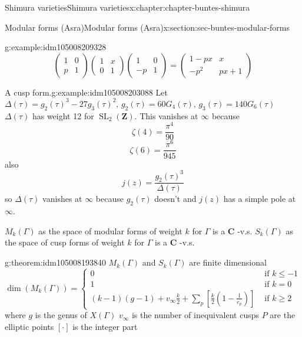 \documentclass[oneside,10pt,]{book}
\numberwithin{equation}{section}
\newcommand{\lb}{[}
\newcommand{\rb}{]}
\newcommand{\ZZ}{\mathbf{Z}}
\newcommand{\CC}{\mathbf{C}}
\DeclareMathOperator{\SL}{SL}
\newcommand{\amp}{&}
\begin{document}
\begin{chapterptx}{Shimura varieties}{}{Shimura varieties}{}{}{x:chapter:chapter-buntes-shimura}
\begin{sectionptx}{Modular forms (Asra)}{}{Modular forms (Asra)}{}{}{x:section:sec-buntes-modular-forms}
\begin{example}{}{g:example:idm105008209328}
\begin{equation*}
\begin{pmatrix} 1\amp 0 \\ p \amp 1 \end{pmatrix} \begin{pmatrix} 1\amp x \\ 0 \amp 1 \end{pmatrix} \begin{pmatrix} 1\amp 0 \\ -p \amp 1 \end{pmatrix}  = \begin{pmatrix} 1 - px \amp x  \\ -p^2 \amp px+ 1 \end{pmatrix}
\end{equation*}
%
\end{example}
\begin{example}{A cusp form.}{g:example:idm105008203088}%
Let \(\Delta(\tau) = g_2(\tau)^3 - 27g_3(\tau)^2,\,g_2(\tau) = 60G_4(\tau),\,g_3(\tau) =140G_6(\tau)\) \(\Delta(\tau)\) has weight 12 for \(\SL_2(\ZZ)\). This vanishes at \(\infty\) because%
\begin{equation*}
\zeta(4) = \frac{\pi^4}{90}
\end{equation*}
%
\begin{equation*}
\zeta(6) = \frac{\pi^6}{945}
\end{equation*}
also%
\begin{equation*}
j(z) = \frac{g_2(\tau)^3}{\Delta(\tau)}
\end{equation*}
so \(\Delta(\tau)\) vanishes at \(\infty\) because \(g_2(\tau)\) doesn't  and \(j(z)\) has a  simple pole at \(\infty\).%
\end{example}
\(M_k(\Gamma)\) as the space of modular forms of weight \(k\) for \(\Gamma\) is a \(\CC\) -v.s. \(S_k(\Gamma)\) as the space of cusp forms of weight \(k\) for \(\Gamma\) is a \(\CC\) -v.s.%
\begin{theorem}{}{}{g:theorem:idm105008193840}%
\(M_k(\Gamma)\) and \(S_k(\Gamma)\) are finite dimensional%
\begin{equation*}
\dim(M_k(\Gamma)) =
\begin{cases}
0 \amp \text{ if } k \le -1\\
1 \amp \text{ if } k = 0\\
(k-1)(g-1) + v_\infty \frac k2 + \sum_p [\frac k2 (1- \frac{1}{e_p})] \amp \text{ if } k \ge 2
\end{cases}
\end{equation*}
where \(g\) is the genus of \(X(\Gamma)\) \(v_\infty\) is the number of inequivalent cusps \(P\) are the elliptic points \(\lb \cdot \rb\) is the integer part%

\end{theorem}
\end{sectionptx}
\end{chapterptx}
\end{document}
